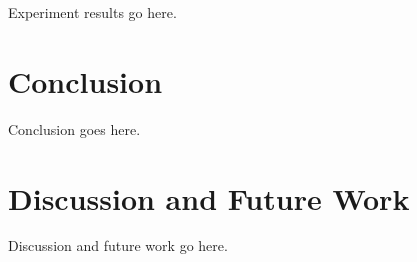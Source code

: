 \documentclass[11pt]{article}
\begin{document}
Experiment results go here.

\begin{figure}[htbp]
\centering
{}%
\end{figure}

\section{Conclusion}

Conclusion goes here.

\section{Discussion and Future Work}

Discussion and future work go here.



\end{document}
